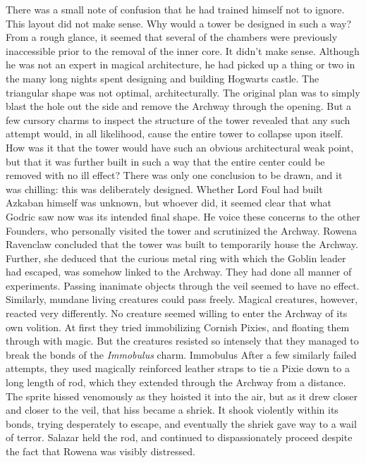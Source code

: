 \SmallVSpace
There was a small note of confusion that he had trained himself not to ignore. This layout did not make sense. Why would a tower be designed in such a way? From a rough glance, it seemed that several of the chambers were previously inaccessible prior to the removal of the inner core. It didn’t make sense. Although he was not an expert in magical architecture, he had picked up a thing or two in the many long nights spent designing and building Hogwarts castle.
\SmallVSpace
The triangular shape was not optimal, architecturally. The original plan was to simply blast the hole out the side and remove the Archway through the opening. But a few cursory charms to inspect the structure of the tower revealed that any such attempt would, in all likelihood, cause the entire tower to collapse upon itself.
\SmallVSpace
How was it that the tower would have such an obvious architectural weak point, but that it was further built in such a way that the entire center could be removed with no ill effect? There was only one conclusion to be drawn, and it was chilling: this was deliberately designed. Whether Lord Foul had built Azkaban himself was unknown, but whoever did, it seemed clear that what Godric saw now was its intended final shape.
\SmallVSpace
He voice these concerns to the other Founders, who personally visited the tower and scrutinized the Archway. Rowena Ravenclaw concluded that the tower was built to temporarily house the Archway. Further, she deduced that the curious metal ring with which the Goblin leader had escaped, was somehow linked to the Archway.
\SmallVSpace
They had done all manner of experiments. Passing inanimate objects through the veil seemed to have no effect. Similarly, mundane living creatures could pass freely. Magical creatures, however, reacted very differently. No creature seemed willing to enter the Archway of its own volition. At first they tried immobilizing Cornish Pixies, and floating them through with magic. But the creatures resisted so intensely that they managed to break the bonds of the \emph{Immobulus} charm.
Immobulus
After a few similarly failed attempts, they used magically reinforced leather straps to tie a Pixie down to a long length of rod, which they extended through the Archway from a distance. The sprite hissed venomously as they hoisted it into the air, but as it drew closer and closer to the veil, that hiss became a shriek. It shook violently within its bonds, trying desperately to escape, and eventually the shriek gave way to a wail of terror. Salazar held the rod, and continued to dispassionately proceed despite the fact that Rowena was visibly distressed.
